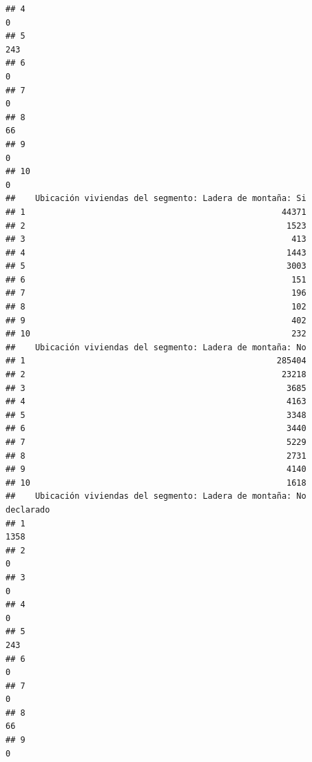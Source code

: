 \documentclass[11pt,]{article}
\begin{document}
\begin{verbatim}
## 4                                                                         0
## 5                                                                       243
## 6                                                                         0
## 7                                                                         0
## 8                                                                        66
## 9                                                                         0
## 10                                                                        0
##    Ubicación viviendas del segmento: Ladera de montaña: Si
## 1                                                    44371
## 2                                                     1523
## 3                                                      413
## 4                                                     1443
## 5                                                     3003
## 6                                                      151
## 7                                                      196
## 8                                                      102
## 9                                                      402
## 10                                                     232
##    Ubicación viviendas del segmento: Ladera de montaña: No
## 1                                                   285404
## 2                                                    23218
## 3                                                     3685
## 4                                                     4163
## 5                                                     3348
## 6                                                     3440
## 7                                                     5229
## 8                                                     2731
## 9                                                     4140
## 10                                                    1618
##    Ubicación viviendas del segmento: Ladera de montaña: No declarado
## 1                                                               1358
## 2                                                                  0
## 3                                                                  0
## 4                                                                  0
## 5                                                                243
## 6                                                                  0
## 7                                                                  0
## 8                                                                 66
## 9                                                                  0

\end{verbatim}
\end{document}
